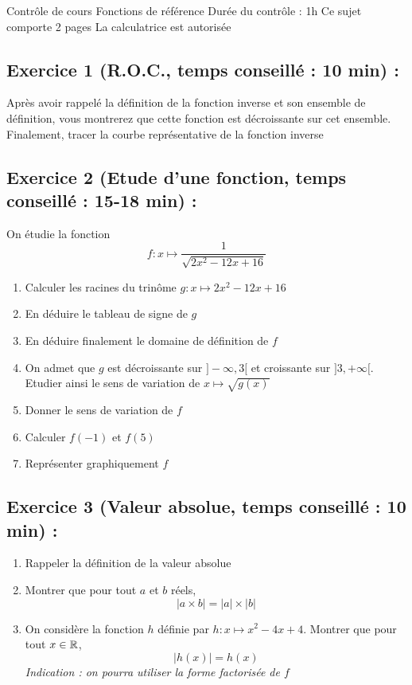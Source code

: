 



\center
\Large Contrôle de cours
\flushleft
\center
Fonctions de référence
\flushleft \normalsize
Durée du contrôle : 1h\newline
Ce sujet comporte 2 pages\newline
La calculatrice est autorisée
\subsection*{Exercice 1 (R.O.C., temps conseillé : 10 min) : }
Après avoir rappelé la définition de la fonction inverse et son ensemble de définition, vous montrerez que cette fonction est décroissante sur cet ensemble. Finalement, tracer la courbe représentative de la fonction inverse
\subsection*{Exercice 2 (Etude d'une fonction, temps conseillé : 15-18 min) : }
On étudie la fonction 
$$f:x\mapsto \frac{1}{\sqrt{2x^2-12x+16}}$$
\begin{enumerate}
\item Calculer les racines du trinôme $g:x\mapsto 2x^2-12x+16$
\item En déduire le tableau de signe de $g$
\item En déduire finalement le domaine de définition de $f$
\item On admet que $g$ est décroissante sur $]-\infty,3[$ et croissante sur $]3,+\infty[$. Etudier ainsi le sens de variation de $x\mapsto \sqrt{g(x)}$
\item Donner le sens de variation de $f$
\item Calculer $f(-1)$ et $f(5)$
\item Représenter graphiquement $f$
\end{enumerate}
\subsection*{Exercice 3 (Valeur absolue, temps conseillé : 10 min) : }
\begin{enumerate}
\item Rappeler la définition de la valeur absolue
\item Montrer que pour tout $a$ et $b$ réels, 
$$|a\times b| = |a| \times |b|$$
\item On considère la fonction $h$ définie par $h:x\mapsto x^2-4x+4$. Montrer que pour tout $x\in \mathbb{R}$, $$|h(x)| = h(x)$$\emph{Indication : on pourra utiliser la forme factorisée de $f$}
\end{enumerate}
